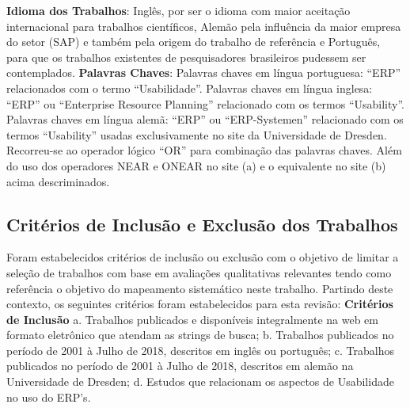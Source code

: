 \noindent \textbf{Idioma dos Trabalhos}: Inglês, por ser o idioma com maior aceitação internacional para trabalhos científicos, Alemão pela influência da maior empresa do setor (SAP) e também pela origem do trabalho de referência e Português, para que os trabalhos existentes de pesquisadores brasileiros pudessem ser contemplados.
\newline
\textbf{Palavras Chaves}: Palavras chaves em língua portuguesa: “ERP” relacionados com o termo “Usabilidade”. Palavras chaves em língua inglesa: “ERP” ou “Enterprise Resource Planning” relacionado com os termos “Usability”. Palavras chaves em língua alemã: “ERP” ou “ERP-Systemen” relacionado com os termos “Usability” usadas exclusivamente no site da Universidade de Dresden.
\newline
Recorreu-se ao operador lógico “OR” para combinação das palavras chaves. Além do uso dos operadores NEAR e ONEAR no site (a) e o equivalente no site (b) acima descriminados.
\newline
\newline
\subsection{Critérios de Inclusão e Exclusão dos Trabalhos}
\newline
\newline
Foram estabelecidos critérios de inclusão ou exclusão com o objetivo de limitar a seleção de trabalhos com base em avaliações qualitativas relevantes tendo como referência o objetivo do mapeamento sistemático neste trabalho. Partindo deste contexto, os seguintes critérios foram estabelecidos para esta revisão:
\newline
\newline
\noindent \textbf{Critérios de Inclusão}\newline
\newline
\indent a. Trabalhos publicados e disponíveis integralmente na web em formato eletrônico que atendam as strings de busca;\newline
\indent b. Trabalhos publicados no período de 2001 à Julho de 2018, descritos em inglês ou português;\newline
\indent c. Trabalhos publicados no período de 2001 à Julho de 2018, descritos em alemão na Universidade de Dresden;\newline
\indent d. Estudos que relacionam os aspectos de Usabilidade no uso do ERP's.\newline

